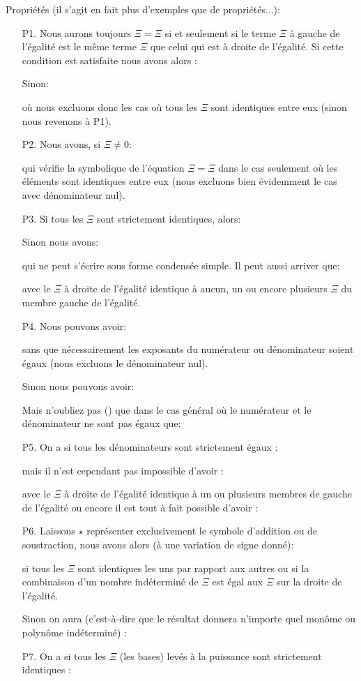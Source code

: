 	Propriétés (il s'agit en fait plus d'exemples que de propriétés...):
	\begin{enumerate}
		\item[P1.] Nous aurons toujours $\Xi=\Xi$ si et seulement si le terme $\Xi$ à gauche de l'égalité est le même terme $\Xi$  que celui qui est à droite de l'égalité. Si cette condition est satisfaite nous avons alors :
		
		Sinon:
		
		où nous excluons donc les cas où tous les $\Xi$ sont identiques entre eux (sinon nous revenons à P1).
		
		\item[P2.] Nous avons, si $\Xi\neq 0$:
		
		qui vérifie la symbolique de l'équation $\Xi=\Xi$ dans le cas seulement où les éléments sont identiques entre eux (nous excluons bien évidemment le cas avec dénominateur nul).
	
		\item[P3.] \label{power rules calculations}Si tous les $\Xi$ sont strictement identiques, alors:
				
		Sinon nous avons:
		
		qui ne peut s'écrire sous forme condensée simple. Il peut aussi arriver que:
		
		avec le $\Xi$ à droite de l'égalité identique à aucun, un ou encore plusieurs $\Xi$ du membre gauche de l'égalité.

		\item[P4.] Nous pouvons avoir:
		
		sans que nécessairement les exposants du numérateur ou dénominateur soient égaux (nous excluons le dénominateur nul).

		Sinon nous pouvons avoir:
		
		Mais n'oubliez pas () que dans le cas général où le numérateur et le dénominateur ne sont pas égaux que:
		
		
		\item[P5.] On a si tous les dénominateurs sont strictement égaux :
		
		mais il n'est cependant pas impossible d'avoir :
		
		avec le $\Xi$ à droite de l'égalité identique à un ou plusieurs membres de gauche de l'égalité ou encore il est tout à fait possible d'avoir :
		

		\item[P6.] Laissons $\star$ représenter exclusivement le symbole d'addition ou de soustraction, nous avons alors (à une variation de signe donné):
		
		si tous les $\Xi$ sont identiques les uns par rapport aux autres ou si la combinaison d'un nombre indéterminé de $\Xi$ est égal aux $\Xi$ sur la droite de l'égalité.

		Sinon on aura (c'est-à-dire que le résultat donnera n'importe quel monôme ou polynôme indéterminé) :
		

		\item[P7.] On a si tous les $\Xi$ (les bases) levés à la puissance sont strictement identiques :
		
	\end{enumerate}
